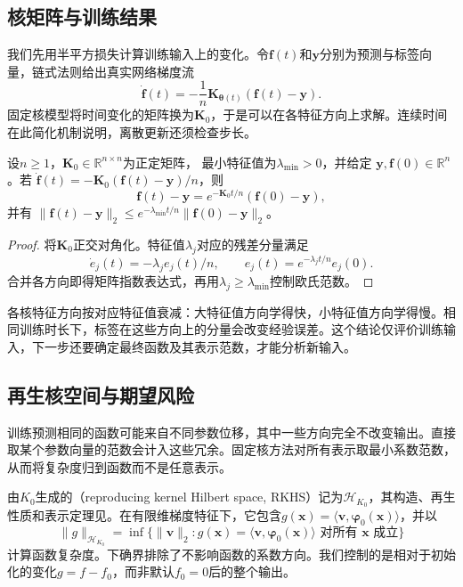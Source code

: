 \subsection{核矩阵与训练结果}

我们先用半平方损失计算训练输入上的变化。令$\bm f(t)$和$\bm y$分别为预测与标签向量，链式法则给出真实网络梯度流
\[
 \dot{\bm f}(t)=-\frac1n\bm K_{\bm\theta(t)}(\bm f(t)-\bm y).
\]
固定核模型将时间变化的矩阵换为$\bm K_0$，于是可以在各特征方向上求解。连续时间在此简化机制说明，离散更新还须检查步长。

\begin{theorem}[固定NTK下的训练收敛]
\label{thm:ntk-training-convergence}
设$n\geq1$，$\bm K_0\in\mathbb R^{n\times n}$为正定矩阵，
最小特征值为$\lambda_{\min}>0$，并给定
$\bm y,\bm f(0)\in\mathbb R^n$。若
$\dot{\bm f}(t)=-\bm K_0(\bm f(t)-\bm y)/n$，则
\[
 \bm f(t)-\bm y=e^{-\bm K_0t/n}(\bm f(0)-\bm y),
\]
并有
$\|\bm f(t)-\bm y\|_2\leq e^{-\lambda_{\min}t/n}\|\bm f(0)-\bm y\|_2$。
\end{theorem}
\begin{proof}
将$\bm K_0$正交对角化。特征值$\lambda_j$对应的残差分量满足
\[
 \dot e_j(t)=-\lambda_j e_j(t)/n,\qquad
 e_j(t)=e^{-\lambda_jt/n}e_j(0).
\]
合并各方向即得矩阵指数表达式，再用$\lambda_j\geq\lambda_{\min}$控制欧氏范数。
\end{proof}

各核特征方向按对应特征值衰减：大特征值方向学得快，小特征值方向学得慢。相同训练时长下，标签在这些方向上的分量会改变经验误差。这个结论仅评价训练输入，下一步还要确定最终函数及其表示范数，才能分析新输入。

\subsection{再生核空间与期望风险}
\label{sec:ntk-rkhs-generalization}

训练预测相同的函数可能来自不同参数位移，其中一些方向完全不改变输出。直接取某个参数向量的范数会计入这些冗余。固定核方法对所有表示取最小系数范数，从而将复杂度归到函数而不是任意表示。

由$K_0$生成的（reproducing kernel Hilbert space, RKHS）记为$\mathcal H_{K_0}$，其构造、再生性质和表示定理见。在有限维梯度特征下，它包含$g(\bm x)=\langle\bm v,\bm\varphi_0(\bm x)\rangle$，并以
\[
 \|g\|_{\mathcal H_{K_0}}
 =\inf\{\|\bm v\|_2:g(\bm x)=\langle\bm v,\bm\varphi_0(\bm x)\rangle
                         \text{ 对所有 }\bm x\text{ 成立}\}
\]
计算函数复杂度。下确界排除了不影响函数的系数方向。我们控制的是相对于初始化的变化$g=f-f_0$，而非默认$f_0=0$后的整个输出。

